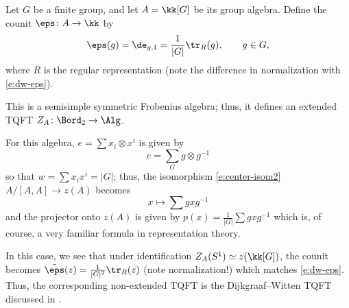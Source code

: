 \begin{example}\label{x:DW-extended}
  Let $G$ be a finite group, and let $A=\kk[G]$ be its group algebra.
  Define the counit $\eps\colon A\to \kk$ by
  $$
  \eps(g)=\de_{g,1} = \frac{1}{|G|}\tr_R(g), \qquad g\in G,
  $$
  where $R$ is the regular representation (note the difference in normalization
  with \eqref{e:dw-eps}).

  This is a semisimple symmetric Frobenius algebra; thus, it defines an extended
  TQFT $Z_A\colon \Bord_2\to \Alg$.

  For this algebra, $e=\sum x_i\otimes x^i$ is given by
  $$
  e=\sum_G g\otimes g^{-1}
  $$
  so that $w=\sum x_ix^i=|G|$; thus, the isomorphism \eqref{e:center-isom2}
  $A/[A,A]\to z(A)$ becomes
  $$
    x\mapsto \sum gxg^{-1}
  $$
  and the projector onto $z(A)$ is given by $p(x)=\frac{1}{|G|} \sum gxg^{-1}$
  which is, of course, a very familiar formula in representation theory.

  In this case, we see that under identification $Z_A(S^1)\simeq
  z(\kk[G])$, the counit becomes $\tilde \eps(z)=\frac{1}{|G|^2}\tr_R(z)$
  (note normalization!) which matches \eqref{e:dw-eps}. Thus, the
  corresponding non-extended TQFT is the Dijkgraaf--Witten TQFT discussed in
  .
\end{example}







\clearpage
